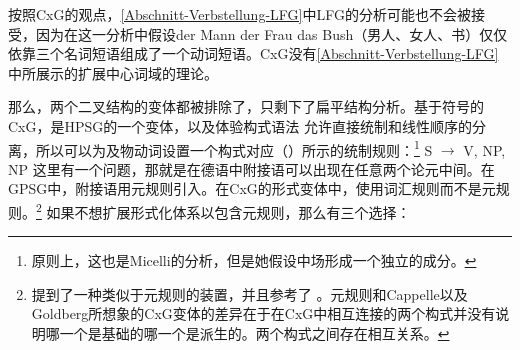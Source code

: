 按照CxG的观点，\ref{Abschnitt-Verbstellung-LFG}中LFG的分析可能也不会被接受，因为在这一分析中假设der Mann der Frau das Bush（男人、女人、书）仅仅依靠三个名词短语组成了一个动词短语。CxG没有\ref{Abschnitt-Verbstellung-LFG}中所展示的扩展中心词域的理论。

那么，两个二叉结构的变体都被排除了，只剩下了扁平结构分析。基于符号的CxG，是HPSG的一个变体\citep[]{Sag2010b}，以及体验构式语法 \citep[]{BC2005a}允许直接统制和线性顺序的分离，所以可以为及物动词设置一个构式对应（）所示的统制规则：\footnote{%
	原则上，这也是Micelli的分析，但是她假设中场形成一个独立的成分。%
}
\ea
S $\to$ V, NP, NP
\z
这里有一个问题，那就是在德语中附接语可以出现在任意两个论元中间。在GPSG中，附接语用元规则引入。在CxG的形式变体中，使用词汇规则而不是元规则。\footnote{\label{fn-allostructions}%
   \citet[]{Goldberg2014a}提到了一种类似于元规则的装置，并且参考了 。元规则和Cappelle以及Goldberg所想象的CxG变体的差异在于在CxG中相互连接的两个构式并没有说明哪一个是基础的哪一个是派生的。两个构式之间存在相互关系。%
} 如果不想扩展形式化体系以包含元规则，那么有三个选择：
